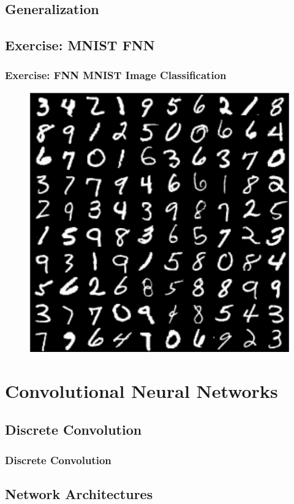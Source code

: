 \documentclass[aspectratio=169]{beamer}
\newcommand\imageright[1]{ %
    \caption*{\scalebox{.5}{\textcolor{lightgray}{\textcopyright~#1}}} %
}
\begin{document}
\subsection{Generalization}
\label{subsec:generalization}

\subsection{Exercise: MNIST FNN}
\label{subsec:exercise-fnn}

\begin{frame}
    \frametitle{Exercise: FNN MNIST Image Classification}
    
    \begin{figure}
        \centering
        \includegraphics[width=0.4\linewidth]{mnist.png}
    \end{figure}
\end{frame}

\section{Convolutional Neural Networks}
\label{sec:convolutional-neural-networks}

\subsection{Discrete Convolution}
\label{subsec:discrete-convolution}

\begin{frame}
    \frametitle{Discrete Convolution}
    \begin{figure}
        \centering
        \imageright{Machine Learning Guru}
    \end{figure}
\end{frame}

\subsection{Network Architectures}
\label{subsec:network-architectures}
\end{document}
